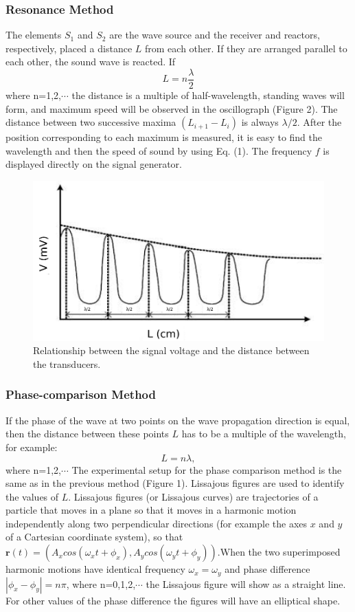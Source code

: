 \documentclass[12pt]{article}
\begin{document}
\subsubsection{Resonance Method}
The elements $S_1$ and $S_2$ are the wave source and the receiver and reactors, respectively, placed a distance $L$ from each other. If they are arranged parallel to each other, the sound wave is reacted. If
\begin{equation}
L=n\frac{\lambda}{2}
\end{equation}
where n=1,2,$\cdots$ the distance is a multiple of half-wavelength, standing waves will form, and maximum speed will be observed in the oscillograph (Figure 2). The distance between two successive maxima $(L_{i+1}-L_i)$ is always $\lambda /2$. After the position corresponding to each maximum is measured, it is easy to find the wavelength and then the speed of sound by using Eq. (1). The frequency $f$ is displayed directly on the signal generator.
\begin{figure}[H]
\centering
\includegraphics[scale=0.5]{P2.jpg}
\caption{Relationship between the signal voltage and the distance between the transducers.}
\end{figure}
\subsubsection{Phase-comparison Method}
If the phase of the wave at two points on the wave propagation direction is equal, then the distance between these points $L$ has to be a multiple of the wavelength, for example:$$L=n\lambda,$$where n=1,2,$\cdots$ The experimental setup for the phase comparison method is the same as in the previous method (Figure 1). Lissajous figures are used to identify the values of $L$. Lissajous figures (or Lissajous curves) are trajectories of a particle that moves in a plane so that it moves in a harmonic motion independently along two perpendicular directions (for example the axes $x$ and $y$ of a Cartesian coordinate system), so that $\textbf{r}(t)=(A_x cos(\omega_xt+\phi_x),A_y cos(\omega_yt + \phi_y)).$When the two superimposed harmonic motions have
identical frequency $\omega_x=\omega_y$ and phase difference $|\phi_x-\phi_y|= n\pi$, where n=0,1,2,$\cdots$ the Lissajous figure will show as a straight line. For other values of the phase difference the figures will have an elliptical shape.
\end{document}
